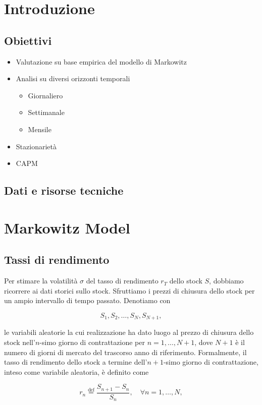 \documentclass[compress]{beamer}
\begin{document}
\begin{frame}[plain]
	\titlepage
\end{frame}
\section{Introduzione}

\subsection{Obiettivi}
\begin{frame}{\subsecname}
	\begin{itemize}
		\item Valutazione su base empirica del modello di Markowitz
		\item Analisi su diversi orizzonti temporali
		      \begin{itemize}
			      \item Giornaliero
			      \item Settimanale
			      \item Mensile
		      \end{itemize}
		\item Stazionarietà
		\item CAPM
	\end{itemize}

\end{frame}

\subsection{Dati e risorse tecniche}
\begin{frame}{\subsecname}

\end{frame}

\section{Markowitz Model}

\subsection{Tassi di rendimento}
\begin{frame}{\subsecname}
	Per stimare la volatilità $\sigma$ del tasso di rendimento $r_T$ dello stock $S$, dobbiamo ricorrere ai dati storici sullo stock. Sfruttiamo i prezzi di chiusura dello stock per un ampio intervallo di tempo passato. Denotiamo con

	\[
		S_1, S_2, \dots, S_N, S_{N+1},
	\]

	le variabili aleatorie la cui realizzazione ha dato luogo al prezzo di chiusura dello stock nell'$n$-simo giorno di contrattazione per $n = 1, \dots, N+1$, dove $N+1$ è il numero di giorni di mercato del trascorso anno di riferimento. Formalmente, il tasso di rendimento dello stock a termine dell’$n+1$-simo giorno di contrattazione, inteso come variabile aleatoria, è definito come

	\[
		r_n \overset{\text{def}}{=} \frac{S_{n+1} - S_n}{S_n}, \quad \forall n = 1, \dots, N,
	\]
\end{frame}
\end{document}
